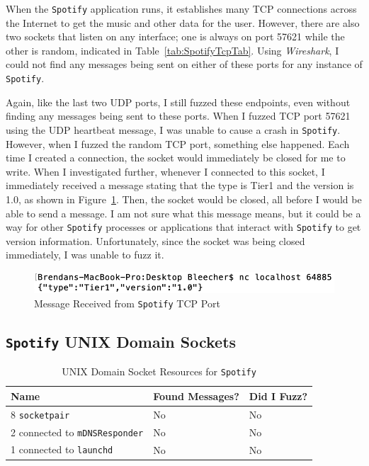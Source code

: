 When the \texttt{Spotify} application runs, it establishes many TCP connections across the Internet to get the music and other data for the user.  However, there are also two sockets that listen on any interface; one is always on port 57621 while the other is random, indicated in Table~\ref{tab:SpotifyTcpTab}.  Using \textit{Wireshark}, I could not find any messages being sent on either of these ports for any instance of \texttt{Spotify}.

Again, like the last two UDP ports, I still fuzzed these endpoints, even without finding any messages being sent to these ports.  When I fuzzed TCP port 57621 using the UDP heartbeat message, I was unable to cause a crash in \texttt{Spotify}.  However, when I fuzzed the random TCP port, something else happened.  Each time I created a connection, the socket would immediately be closed for me to write.  When I investigated further, whenever I connected to this socket, I immediately received a message stating that the type is Tier1 and the version is 1.0, as shown in Figure~\ref{fig:spotifyTcpResponse}.  Then, the socket would be closed, all before I would be able to send a message.  I am not sure what this message means, but it could be a way for other \texttt{Spotify} processes or applications that interact with \texttt{Spotify} to get version information.  Unfortunately, since the socket was being closed immediately, I was unable to fuzz it.

\begin{figure}
\centering
\includegraphics[width=1\textwidth]{spotifyMessage.png}
\caption{Message Received from \texttt{Spotify} TCP Port}
\label{fig:spotifyTcpResponse}
\end{figure}

\subsection{\texttt{Spotify} UNIX Domain Sockets}
\label{sec:spotifyUnix}

\begin{table}
\centering
\begin{normalsize}
\begin{tabular}{ l | l | l }
\textbf{Name} & \textbf{Found Messages?} & \textbf{Did I Fuzz?} \\ \hline
8 \texttt{socketpair} & No & No \\ \hline
2 connected to \texttt{mDNSResponder} & No & No \\ \hline
1 connected to \texttt{launchd} & No & No \\ \hline
\end{tabular}
\caption{UNIX Domain Socket Resources for \texttt{Spotify}}
\label{tab:spotifyUnixTab}
\end{normalsize}
\end{table} 

